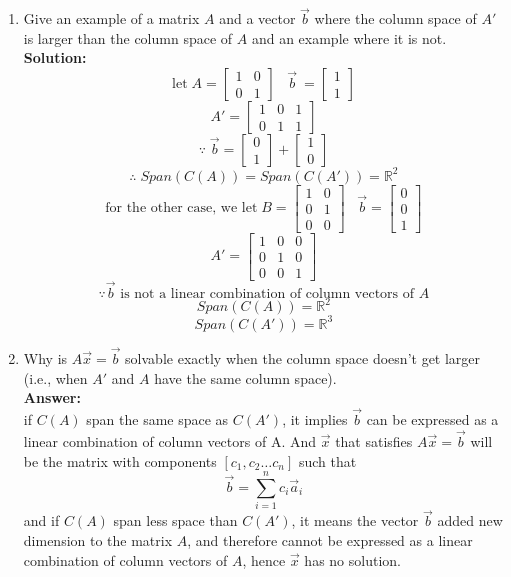\documentclass[12pt]{article}
\begin{document}
\begin{enumerate}
\begin{enumerate}
	\item Give an example of a matrix $A$ and a vector $\vec b$ where the column space of $A'$ is larger than the column space of $A$ and an example where it is not.  
 \\
 \textbf{Solution:}\\
 \[
 \text{let}\; A=
 \begin{bmatrix}
1&0\\
0&1
 \end{bmatrix}
 \;\;\;
 \vec b\ = 
 \begin{bmatrix}
 1\\1
 \end{bmatrix}
 \]
 \[
 A'=
 \begin{bmatrix}
     1&0&1\\
     0&1&1
 \end{bmatrix}
 \]
\[ \because \;
 \Vec{b}=
\begin{bmatrix}
     0\\1
\end{bmatrix}
 +
\begin{bmatrix}
     1\\0
\end{bmatrix}
\]
\[
\therefore \; Span(C(A))=Span(C(A'))=\mathbb{R}^2
\]
\[
\text{for the other case, we let}\; B=
\begin{bmatrix}
    1&0\\
    0&1\\
    0&0
\end{bmatrix}\;\;\;
\Vec{b}=
\begin{bmatrix}
    0\\0\\1
\end{bmatrix}
\]
\[
A'=
\begin{bmatrix}
    1&0&0\\
    0&1&0\\
    0&0&1
\end{bmatrix}
\]
\[
\because \text{$\Vec{b}$ is not a linear combination of column vectors of $A$}
\]
\[
Span(C(A))=\mathbb{R}^2
\]
\[
Span(C(A'))=\mathbb{R}^3
\]
	
	\item Why is $A\vec x = \vec b$ solvable exactly when the column space doesn't get larger (i.e., when $A'$ and $A$ have the same column space).
\\
\textbf{Answer: }\\

if $C(A)$ span the same space as $C(A')$, it implies $\Vec{b}$ can be expressed as a linear combination of 
column vectors of A. And $\Vec{x}$ that satisfies $A\vec x = \vec b$ will be the matrix with components $[c_1,c_2 \ldots c_n]$
such that\\
\[
\Vec{b} = \sum_{i=1}^{n} c_i\vec a_i
\]
and if $C(A)$ span less space than $C(A')$, it means the vector $\vec b$ added new dimension to the matrix $A$, and therefore cannot be expressed as a linear combination of column vectors of $A$, hence $\vec x$ has no solution. 


\end{enumerate}
\end{enumerate}
\end{document}
